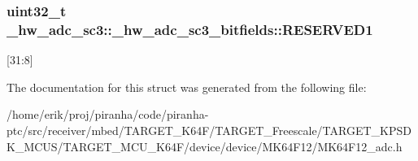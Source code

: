 \subsubsection[{\texorpdfstring{R\+E\+S\+E\+R\+V\+E\+D1}{RESERVED1}}]{\setlength{\rightskip}{0pt plus 5cm}uint32\+\_\+t \+\_\+hw\+\_\+adc\+\_\+sc3\+::\+\_\+hw\+\_\+adc\+\_\+sc3\+\_\+bitfields\+::\+R\+E\+S\+E\+R\+V\+E\+D1}\hypertarget{struct__hw__adc__sc3_1_1__hw__adc__sc3__bitfields_a738e9ad7e008601c18703096b7637ac9}{}\label{struct__hw__adc__sc3_1_1__hw__adc__sc3__bitfields_a738e9ad7e008601c18703096b7637ac9}
\mbox{[}31\+:8\mbox{]} 

The documentation for this struct was generated from the following file\+:\begin{DoxyCompactItemize}
\item 
/home/erik/proj/piranha/code/piranha-\/ptc/src/receiver/mbed/\+T\+A\+R\+G\+E\+T\+\_\+\+K64\+F/\+T\+A\+R\+G\+E\+T\+\_\+\+Freescale/\+T\+A\+R\+G\+E\+T\+\_\+\+K\+P\+S\+D\+K\+\_\+\+M\+C\+U\+S/\+T\+A\+R\+G\+E\+T\+\_\+\+M\+C\+U\+\_\+\+K64\+F/device/device/\+M\+K64\+F12/M\+K64\+F12\+\_\+adc.\+h\end{DoxyCompactItemize}
